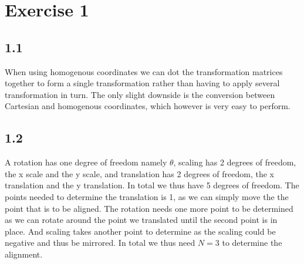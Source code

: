 \section{Exercise 1}
\subsection*{1.1}
When using homogenous coordinates we can dot the transformation matrices together to form a single transformation rather than having to apply several transformation in turn. The only slight downside is the conversion between Cartesian and homogenous coordinates, which however is very easy to perform.

\subsection*{1.2}
A rotation has one degree of freedom namely $\theta$, scaling has 2 degrees of freedom, the x scale and the y scale, and translation has 2 degrees of freedom, the x translation and the y translation. In total we thus have 5 degrees of freedom. The points needed to determine the translation is 1, as we can simply move the the point that is to be aligned. The rotation needs one more point to be determined as we can rotate around the point we translated until the second point is in place. And scaling takes another point to determine as the scaling could be negative and thus be mirrored. In total we thus need $N = 3$  to determine the alignment.
